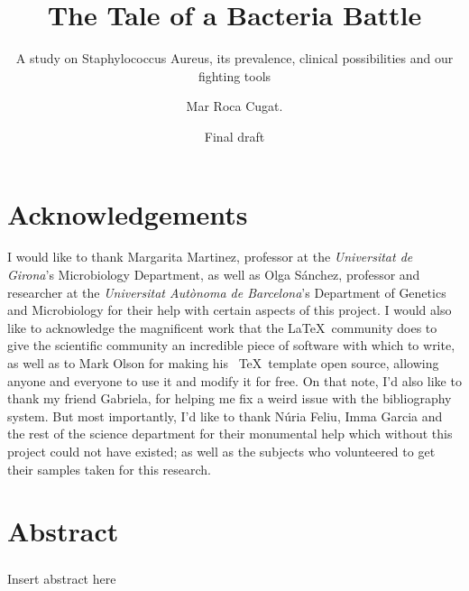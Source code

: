 \documentclass[fontsize=12pt,twoside=semi,openright,numbers=noenddot,parskip=half]{scrbook}
\title{The Tale of a Bacteria Battle}
\subtitle{A study on Staphylococcus Aureus, its prevalence, clinical possibilities and our fighting tools}
\author{Mar Roca Cugat.}
\date{Final draft}
\begin{document}
\maketitle
\cleardoublepage
\renewcommand{\thepage}{\arabic{page}}
\frontmatter
\chapter{Acknowledgements}
\begin{center}
I would like to thank Margarita Martinez, professor at the \emph{Universitat de Girona}'s Microbiology Department, as well as Olga Sánchez, professor and researcher at the \emph{Universitat Autònoma de Barcelona}'s Department of Genetics and Microbiology for their help with certain aspects of this project. \newline
I would also like to acknowledge the magnificent work that the \LaTeX\ community does to give the scientific community an incredible piece of software with which to write, as well as to Mark Olson for making his \KOMAScript\ \TeX\ template open source, allowing anyone and everyone to use it and modify it for free. On that note, I'd also like to thank my friend Gabriela, for helping me fix a weird issue with the bibliography system.\newline
But most importantly, I'd like to thank Núria Feliu, Imma Garcia and the rest of the science department for their monumental help which without this project could not have existed; as well as the subjects who volunteered to get their samples taken for this research.\newline
\end{center}
\chapter{Abstract}
\paragraph{}Insert abstract here
\mainmatter\printindex\tableofcontents
\end{document}
